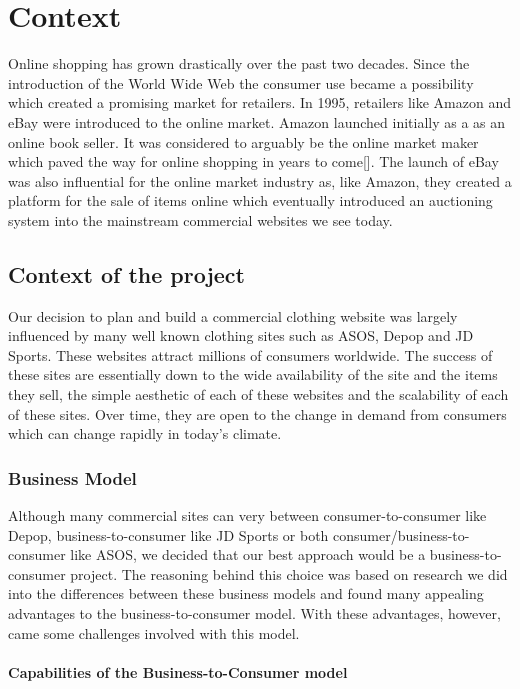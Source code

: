 \chapter{Context}

Online shopping has grown drastically over the past two decades. Since the introduction of the World Wide Web the consumer use became a possibility which created a promising market for retailers. In 1995, retailers like Amazon and eBay were introduced to the online market. Amazon launched initially as a as an online book seller. It was considered to arguably be the online market maker which paved the way for online shopping in years to come[]. The launch of eBay was also influential for the online market industry as, like Amazon, they created a platform for the sale of items online which eventually introduced an auctioning system into the mainstream commercial websites we see today.

\section{Context of the project}
Our decision to plan and build a commercial clothing website was largely influenced by many well known clothing sites such as ASOS, Depop and JD Sports. These websites attract millions of consumers worldwide. The success of these sites are essentially down to the wide availability of the site and the items they sell, the simple aesthetic of each of these websites and the scalability of each of these sites. Over time, they are open to the change in demand from consumers which can change rapidly in today's climate. 

\subsection{Business Model}

Although many commercial sites can very between consumer-to-consumer like Depop, business-to-consumer like JD Sports or both consumer/business-to-consumer like ASOS, we decided that our best approach would be a business-to-consumer project. The reasoning behind this choice was based on research we did into the differences between these business models and found many appealing advantages to the business-to-consumer model. With these advantages, however, came some challenges involved with this model.

\subsubsection{Capabilities of the Business-to-Consumer model}
